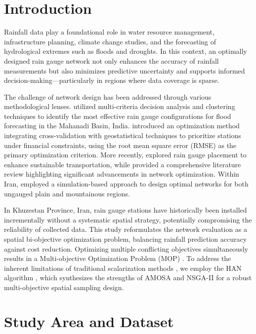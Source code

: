 \documentclass[twoside]{article}
\begin{document}
\section{Introduction}
 
Rainfall data play a foundational role in water resource management, infrastructure planning, climate change studies, and the forecasting of hydrological extremes such as floods and droughts. In this context, an optimally designed rain gauge network not only enhances the accuracy of rainfall measurements but also minimizes predictive uncertainty and supports informed decision-making—particularly in regions where data coverage is sparse.

The challenge of network design has been addressed through various methodological lenses. \cite{Kar:2015} utilized multi-criteria decision analysis and clustering techniques to identify the most effective rain gauge configurations for flood forecasting in the Mahanadi Basin, India. \cite{Ali:2018} introduced an optimization method integrating cross-validation with geostatistical techniques to prioritize stations under financial constraints, using the root mean square error (RMSE) as the primary optimization criterion. More recently, \cite{Simoyama:2022} explored rain gauge placement to enhance sustainable transportation, while \cite{Simoyama:2023} provided a comprehensive literature review highlighting significant advancements in network optimization. Within Iran, \cite{Zarei:2025} employed a simulation-based approach to design optimal networks for both ungauged plain and mountainous regions.

In Khuzestan Province, Iran, rain gauge stations have historically been installed incrementally without a systematic spatial strategy, potentially compromising the reliability of collected data. This study reformulates the network evaluation as a spatial bi-objective optimization problem, balancing rainfall prediction accuracy against cost reduction. Optimizing multiple conflicting objectives simultaneously results in a Multi-objective Optimization Problem (MOP) \citep{Ehrgott:2005}. To address the inherent limitations of traditional scalarization methods \citep{Fei:2017, Zhu:2006}, we employ the HAN algorithm \citep{Lotfian:2023}, which synthesizes the strengths of AMOSA \citep{Bandyopadhyay:2008} and NSGA-II \citep{Deb:2002} for a robust multi-objective spatial sampling design.
 
\section{Study Area and Dataset}
 
\end{document}
